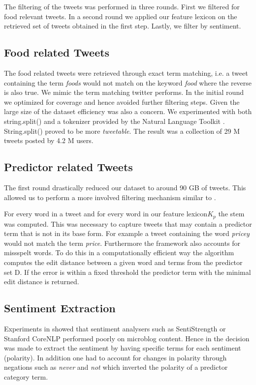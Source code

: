 The filtering of the tweets was performed in three rounds. First we filtered for food relevant tweets. In a second round we applied our feature lexicon on the retrieved set of tweets obtained in the first step. Lastly, we filter by sentiment. 

\subsection{Food related Tweets} 

The food related tweets were retrieved through exact term matching, i.e. a tweet containing the term \emph{foods} would not match on the keyword \emph {food} where the reverse is also true. We mimic the term matching twitter performs. In the initial round we optimized for coverage and hence avoided further filtering steps. Given the large size of the dataset efficiency was also a concern. We experimented with both string.split() and a tokenizer provided by the Natural Language Toolkit \cite{Loper2002}. String.split() proved to be more \emph{tweetable}. The result was a collection of 29 M tweets posted by 4.2 M users. 

\subsection{Predictor related Tweets}

The first round  drastically reduced our dataset to around 90 GB of tweets. This allowed us to perform a more involved filtering mechanism similar to \cite{hum14}. 

For every word in a tweet and for every word in our feature lexicon$K_p$ the stem was computed. This was necessary to capture tweets that may contain a predictor term that is not in its base form. For example a tweet containing the word \emph{pricey} would not match the term \emph{price}. Furthermore the framework also accounts for missspelt words. To do this in a computationally efficient way the algorithm computes the edit distance between a given word and terms from the predictor set D. If the error is within a fixed threshold the predictor term with the minimal edit distance is returned. 

\subsection{Sentiment Extraction}

Experiments in \cite{hum14} showed that sentiment analysers such as SentiStrength \cite{sent10} or Stanford CoreNLP \cite{stanford2011} performed  poorly on microblog content. Hence in \cite{hum14} the decision was made to extract the sentiment by having specific terms for each sentiment (polarity). In addition one had to account for changes in polarity through negations such as \emph{never} and \emph{not} which inverted the polarity of a predictor category term. 

